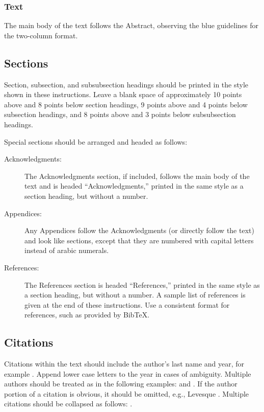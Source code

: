 \subsubsection{Text}
The main body of the text follows the Abstract, observing the blue
guidelines for the two-column format.


\subsection{Sections}

Section, subsection, and subsubsection headings should be printed in the
style shown in these instructions.
Leave a blank space of approximately 10 points above and 8 points below
section headings, 9 points above and 4 points below subsection headings,
and 8 points above and 3 points below subsubsection headings.

Special sections should be arranged and headed as follows:

\begin{description}
\item[Acknowledgments:] The Acknowledgments section, if included,
		       follows the main body of the text and is headed
		       ``Acknowledgments,'' printed in the same style
		       as a section heading, but without a number.
\item[Appendices:] Any Appendices follow the Acknowledgments 
		  (or directly follow the text) and look like
		  sections, except that they are numbered with capital
		  letters instead of arabic numerals.
\item[References:]
The References section is headed ``References,'' printed in the same
style as a section heading, but without a number.
A sample list of references is given at the end of these
instructions.
Use a consistent format for references, such as provided by
Bib\TeX{}.

\end{description}

\subsection{Citations}

Citations within the text should include the author's last name and
year, for example \cite{cheeseman:probability}.
Append lower case letters to the year in cases of ambiguity.
Multiple authors should be treated as in the following examples:
\cite{abelson-et-al:scheme} and
\cite{brachman-schmolze:kl-one}.
If the author portion of a citation is obvious, it should be omitted,
e.g., Levesque .
Multiple citations should be collapsed as follows:
\cite{levesque:functional-foundations,levesque:belief}.


